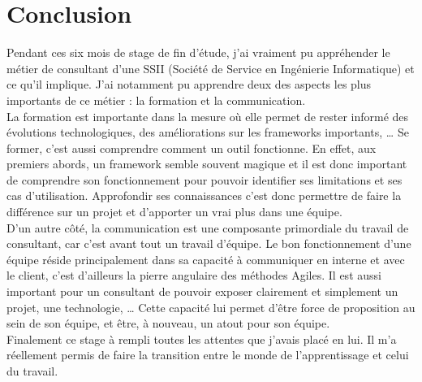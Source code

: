 \chapter*{Conclusion}

Pendant ces six mois de stage de fin d'étude, j'ai vraiment pu appréhender le métier de consultant d'une SSII (Société de Service en Ingénierie Informatique) et ce qu'il implique. J'ai notamment pu apprendre deux des  aspects les plus importants de ce métier : la formation et la communication.\\

La formation est importante dans la mesure où elle permet de rester informé des évolutions technologiques, des améliorations sur les frameworks importants, \dots{} Se former, c'est aussi comprendre comment un outil fonctionne. En effet, aux premiers abords, un framework semble souvent \og magique \fg{} et il est donc important de comprendre son fonctionnement pour pouvoir identifier ses limitations et ses cas d'utilisation. Approfondir ses connaissances c'est donc permettre de faire la différence sur un projet et d'apporter un vrai plus dans une équipe.\\


D'un autre côté, la communication est une composante primordiale du travail de consultant, car c'est avant tout un travail d'équipe. Le bon fonctionnement d'une équipe réside principalement dans sa capacité à communiquer en interne et avec le client, c'est d'ailleurs la pierre angulaire des méthodes Agiles. Il est aussi important pour un consultant  de pouvoir exposer clairement et simplement un projet, une technologie, \dots{} Cette capacité lui permet d'être force de proposition au sein de son équipe, et être, à nouveau, un atout pour son équipe.\\

Finalement ce stage à rempli toutes les attentes que j'avais placé en lui. Il m'a réellement permis de faire la transition entre le monde de l'apprentissage et celui du travail. 
